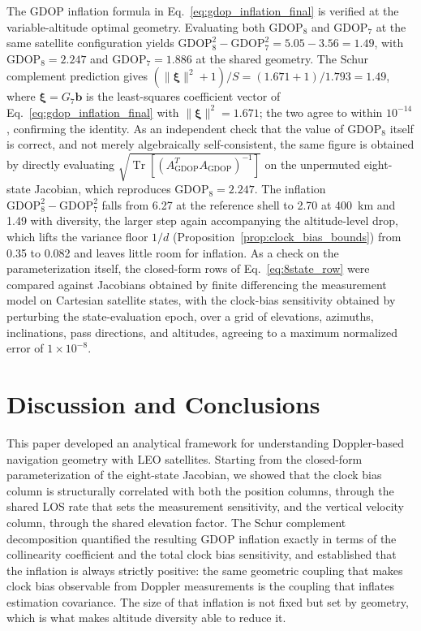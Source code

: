 \documentclass[letterpaper,times]{IONconf-v2}
\theoremstyle{plain}
\theoremstyle{remark}
\begin{document}
The GDOP inflation formula in Eq.~\eqref{eq:gdop_inflation_final} is verified at the variable-altitude optimal geometry. Evaluating both $\mathrm{GDOP}_8$ and $\mathrm{GDOP}_7$ at the same satellite configuration yields $\mathrm{GDOP}_8^2 - \mathrm{GDOP}_7^2 = 5.05 - 3.56 = 1.49$, with $\mathrm{GDOP}_8 = 2.247$ and $\mathrm{GDOP}_7 = 1.886$ at the shared geometry. The Schur complement prediction gives $(\|\boldsymbol{\xi}\|^2 + 1)/S = (1.671 + 1)/1.793 = 1.49$, where $\boldsymbol{\xi} = G_7\mathbf{b}$ is the least-squares coefficient vector of Eq.~\eqref{eq:gdop_inflation_final} with $\|\boldsymbol{\xi}\|^2 = 1.671$; the two agree to within $10^{-14}$, confirming the identity. As an independent check that the value of $\mathrm{GDOP}_8$ itself is correct, and not merely algebraically self-consistent, the same figure is obtained by directly evaluating $\sqrt{\operatorname{Tr}[(A_{\mathrm{GDOP}}^T A_{\mathrm{GDOP}})^{-1}]}$ on the unpermuted eight-state Jacobian, which reproduces $\mathrm{GDOP}_8 = 2.247$. The inflation $\mathrm{GDOP}_8^2 - \mathrm{GDOP}_7^2$ falls from 6.27 at the reference shell to 2.70 at 400~km and 1.49 with diversity, the larger step again accompanying the altitude-level drop, which lifts the variance floor $1/d$ (Proposition~\ref{prop:clock_bias_bounds}) from 0.35 to 0.082 and leaves little room for inflation. As a check on the parameterization itself, the closed-form rows of Eq.~\eqref{eq:8state_row} were compared against Jacobians obtained by finite differencing the measurement model on Cartesian satellite states, with the clock-bias sensitivity obtained by perturbing the state-evaluation epoch, over a grid of elevations, azimuths, inclinations, pass directions, and altitudes, agreeing to a maximum normalized error of $1\times10^{-8}$.

\vspace{-10pt}

\section{Discussion and Conclusions}\label{sec:conclusions}

\vspace{-5pt}

This paper developed an analytical framework for understanding Doppler-based navigation geometry with LEO satellites. Starting from the closed-form parameterization of the eight-state Jacobian, we showed that the clock bias column is structurally correlated with both the position columns, through the shared LOS rate that sets the measurement sensitivity, and the vertical velocity column, through the shared elevation factor. The Schur complement decomposition quantified the resulting GDOP inflation exactly in terms of the collinearity coefficient and the total clock bias sensitivity, and established that the inflation is always strictly positive: the same geometric coupling that makes clock bias observable from Doppler measurements is the coupling that inflates estimation covariance. The size of that inflation is not fixed but set by geometry, which is what makes altitude diversity able to reduce it.
\end{document}
